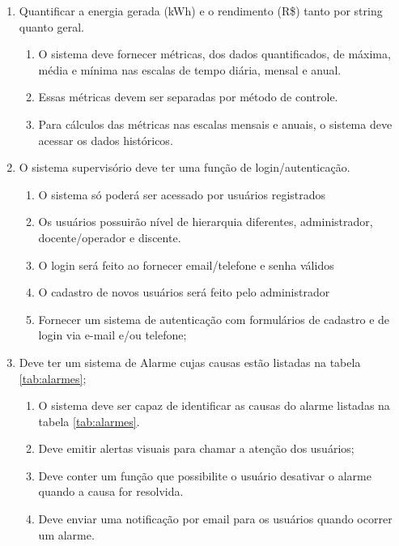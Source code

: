 \documentclass[a4paper,12pt]{article}
\begin{document}
\begin{enumerate}
    \item Quantificar a energia gerada (kWh) e o rendimento (R\$) tanto por string quanto geral.
        \begin{enumerate}
            \item O sistema deve fornecer métricas, dos dados quantificados, de máxima, média e mínima nas escalas de tempo diária, mensal e anual.
            \item Essas métricas devem ser separadas por método de controle.
            \item Para cálculos das métricas nas escalas mensais e anuais, o sistema deve acessar os dados históricos.
        \end{enumerate}

    \item O sistema supervisório deve ter uma função de login/autenticação.
        \begin{enumerate}
            \item O sistema só poderá ser acessado por usuários registrados
            \item Os usuários possuirão nível de hierarquia diferentes, administrador, docente/operador e discente.
            \item O login será feito ao fornecer email/telefone e senha válidos
            \item O cadastro de novos usuários será feito pelo administrador
            \item Fornecer um sistema de autenticação com formulários de cadastro e de login via e-mail e/ou telefone; 
        \end{enumerate}

        \item Deve ter um sistema de Alarme cujas causas estão listadas na tabela \ref{tab:alarmes};
        \begin{enumerate}
            \item O sistema deve ser capaz de identificar as causas do alarme listadas na tabela \ref{tab:alarmes}.
            \item Deve emitir alertas visuais para chamar a atenção dos usuários;
            \item Deve conter um função que possibilite o usuário desativar o alarme quando a causa for resolvida.
            \item Deve enviar uma notificação por email para os usuários quando ocorrer um alarme.
        \end{enumerate}


\end{enumerate}
\end{document}
